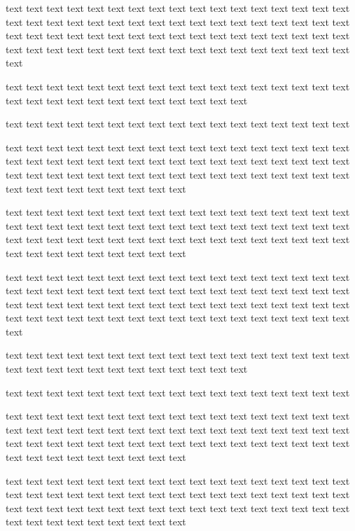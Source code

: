 \documentclass[twocolumn]{article}
\begin{document}
    text text text text text text text text text text text text text text text text text text text text text text text text text text text text text text text text text text text text text text text text text text text text text text text text text text text text text text text text text text text text text text text text text text text text text

    text text text text text text text text text text text text text text text text text text text text text text text text text text text text text

    text text text text text text text text text text text text text text text text text

text text text text text text text text text text text text text text text text text text text text text text text text text text text text text text text text text text text text text text text text text text text text text text text text text text text text text text text text text text text text

    text text text text text text text text text text text text text text text text text text text text text text text text text text text text text text text text text text text text text text text text text text text text text text text text text text text text text text text text text text text text

    text text text text text text text text text text text text text text text text text text text text text text text text text text text text text text text text text text text text text text text text text text text text text text text text text text text text text text text text text text text text text text text text text text text text text

    text text text text text text text text text text text text text text text text text text text text text text text text text text text text text

    text text text text text text text text text text text text text text text text text

text text text text text text text text text text text text text text text text text text text text text text text text text text text text text text text text text text text text text text text text text text text text text text text text text text text text text text text text text text text text

    text text text text text text text text text text text text text text text text text text text text text text text text text text text text text text text text text text text text text text text text text text text text text text text text text text text text text text text text text text text text
\end{document}
